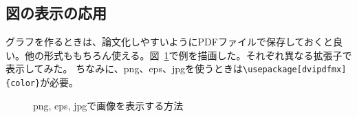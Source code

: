 \documentclass[a4j]{jsarticle}
\begin{document}
\subsection{図の表示の応用}

グラフを作るときは、論文化しやすいようにPDFファイルで保存しておくと良い。他の形式ももちろん使える。図~\ref{fig:various_img}で例を描画した。それぞれ異なる拡張子で表示してみた。
ちなみに、png、eps、jpgを使うときは\verb|\usepackage[dvipdfmx]{color}|が必要。

\begin{figure}[htbp]
\centering
{}
\caption{png, eps, jpgで画像を表示する方法\label{fig:various_img}}
\end{figure}
\end{document}
